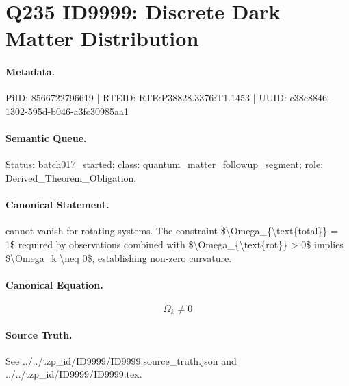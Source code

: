 \section*{Q235 ID9999: Discrete Dark Matter Distribution}
\paragraph{Metadata.}
PiID: 8566722796619 | RTEID: RTE:P38828.3376:T1.1453 | UUID: c38c8846-1302-595d-b046-a3fc30985aa1

\paragraph{Semantic Queue.}
Status: batch017\_started; class: quantum\_matter\_followup\_segment; role: Derived\_Theorem\_Obligation.

\paragraph{Canonical Statement.}
cannot vanish for rotating systems. The constraint \$\textbackslash{}Omega\_\{\textbackslash{}text\{total\}\} = 1\$ required by observations combined with \$\textbackslash{}Omega\_\{\textbackslash{}text\{rot\}\} > 0\$ implies \$\textbackslash{}Omega\_k \textbackslash{}neq 0\$, establishing non-zero curvature.

\paragraph{Canonical Equation.}
\[
\Omega_k \neq 0
\]

\paragraph{Source Truth.}
See ../../tzp\_id/ID9999/ID9999.source\_truth.json and ../../tzp\_id/ID9999/ID9999.tex.
